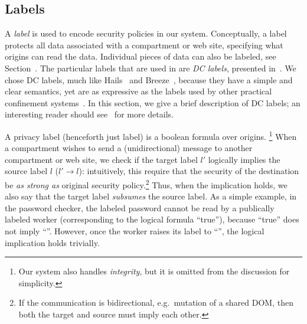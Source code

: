 \subsection{Labels}
\label{sec:labels}

A \emph{label} is used to encode security policies in our system.
%
Conceptually, a label protects all data associated with a compartment or
web site, specifying what origins can read the data.
%
Individual pieces of data can also be labeled, see Section~.
%
The particular labels that are used in \sys{} are \emph{DC labels},
presented in~\cite{stefan:2011:dclabels}.
%
We chose DC labels, much like Hails~\cite{giffin:2012:hails} and
Breeze~\cite{Breeze13}, because they have a simple and clear
semantics, yet are as expressive as the labels used by other practical
confinement systems~\cite{GenLabels}.
%
In this section, we give a brief description of DC labels; an interesting
reader should see~\cite{stefan:2011:dclabels} for more details.

A privacy label (henceforth just label) is a boolean formula over
origins.%
%
\footnote{
  Our system also handles \emph{integrity}, but it is omitted from
  the discussion for simplicity.
}
%
When a compartment wishes to send a (unidirectional) message to another compartment or
web site, we check if the target label $l'$ logically implies the source
label $l$ ($l' \rightarrow l$): intuitively, this require that the security of the destination be \emph{as strong as} original security policy.\footnote{If the communication is bidirectional, e.g.\ mutation of a shared DOM, then both the target and source must imply each other.}
%
Thus, when the implication holds, we also say that the target label
\emph{subsumes} the source label.
%
As a simple example, in the password checker, the labeled password
cannot be read by a publically labeled worker (corresponding to the
logical formula ``true''), because ``true'' does not imply
``''.
%
However, once the worker raises its label to ``'', the
logical implication holds trivially.

